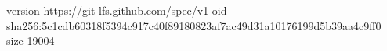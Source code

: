 version https://git-lfs.github.com/spec/v1
oid sha256:5c1cdb60318f5394c917c40f89180823af7ac49d31a10176199d5b39aa4c9ff0
size 19004
